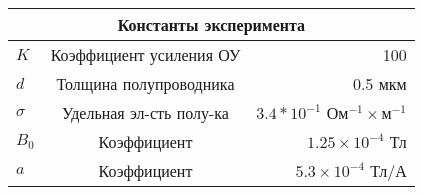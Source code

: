 \begin{table}[htp!]
{\begin{tabular}{|c|c|c|}
        \end{tabular}
    
\quad
\begin{tabular}{|l|c|r|}
    \hline
    \multicolumn{3}{|c|}{Константы эксперимента}\\
    \hline
    $ K $ & Коэффициент усиления ОУ & 100\\
    \hline
    $ d $ & Толщина полупроводника & 0.5 мкм\\
    \hline
    $ \sigma $ & Удельная эл-сть полу-ка & $ 3.4 * 10^{-1} $ Ом$^{-1} \times$м$^{-1}$\\
    \hline
    $ B_0 $ & Коэффициент & $ 1.25 \times 10^{-4} $ Тл\\
    \hline
    $ a $ & Коэффициент & $ 5.3 \times 10^{-4} $ Тл/А\\
    \hline
\end{tabular}
    
    }  %
\end{table}
    